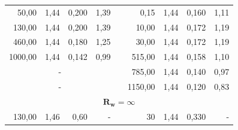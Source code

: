 \documentclass[a4paper,12pt]{article}
\begin{document}
\begin{table}[ht]
\begin{center}
\begin{tabular}{|r|r|r|r|r|r|r|r|r|}
    50,00 & 1,44 & 0,200 & 1,39 & & 0,15 & 1,44 & 0,160 & 1,11 \\ \cline{1-4} \cline{6-9}
    130,00 & 1,44 & 0,200 & 1,39 & & 10,00 & 1,44 & 0,172 & 1,19 \\ \cline{1-4} \cline{6-9}
    460,00 & 1,44 & 0,180 & 1,25 & & 30,00 & 1,44 & 0,172 & 1,19 \\ \cline{1-4} \cline{6-9}
    1000,00 & 1,44 & 0,142 & 0,99 & & 515,00 & 1,44 & 0,158 & 1,10 \\ \cline{1-4} \cline{6-9}
    \multicolumn{4}{|c|}{-} & & 785,00 & 1,44 & 0,140 & 0,97 \\ \cline{1-4} \cline{6-9}
    \multicolumn{4}{|c|}{-} & & 1150,00 & 1,44 & 0,120 & 0,83 \\ \hline
    \multicolumn{9}{|c|}{$\mathbf{R_w = \infty}$} \\ \hline
    130,00 & 1,46 & 0,60 & - & & 30 & 1,44 & 0,330 & - \\ \hline

  \end{tabular}
  \end{center}
  
\end{table}


\end{document}
